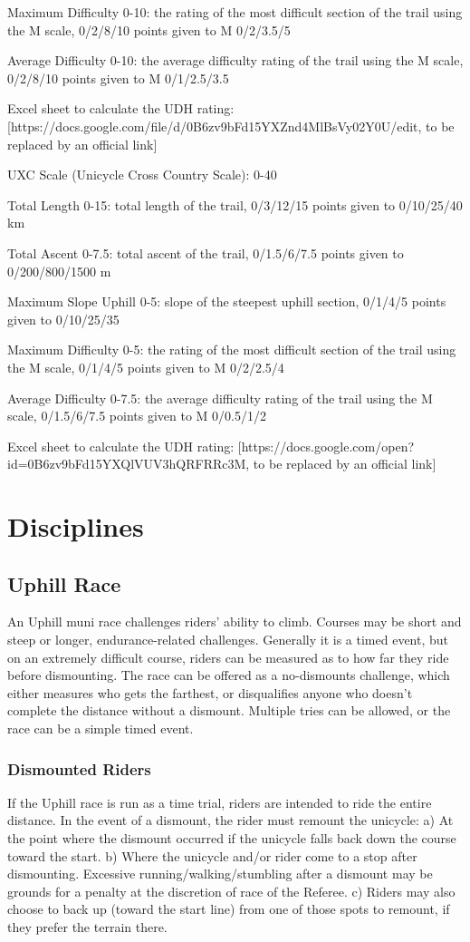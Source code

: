 Maximum Difficulty 0-10: the rating of the most difficult section of the trail using the M scale, 0/2/8/10 points given to M 0/2/3.5/5

Average Difficulty 0-10: the average difficulty rating of the trail using the M scale, 0/2/8/10 points given to M 0/1/2.5/3.5

Excel sheet to calculate the UDH rating: [https://docs.google.com/file/d/0B6zv9bFd15YXZnd4MlBsVy02Y0U/edit, to be replaced by an official link]

UXC Scale (Unicycle Cross Country Scale): 0-40

Total Length 0-15: total length of the trail, 0/3/12/15 points given to 0/10/25/40 km

Total Ascent 0-7.5: total ascent of the trail, 0/1.5/6/7.5 points given to 0/200/800/1500 m

Maximum Slope Uphill 0-5: slope of the steepest uphill section, 0/1/4/5 points given to 0/10/25/35%

Maximum Difficulty 0-5: the rating of the most difficult section of the trail using the M scale, 0/1/4/5 points given to M 0/2/2.5/4

Average Difficulty 0-7.5: the average difficulty rating of the trail using the M scale, 0/1.5/6/7.5 points given to M 0/0.5/1/2

Excel sheet to calculate the UDH rating: [https://docs.google.com/open?id=0B6zv9bFd15YXQlVUV3hQRFRRc3M, to be replaced by an official link]


\section{Disciplines}

\subsection{Uphill Race}
An Uphill muni race challenges riders' ability to climb. Courses may be short
and steep or longer, endurance-related challenges. Generally it is a timed
event, but on an extremely difficult course, riders can be measured as to how
far they ride before dismounting. The race can be offered as a no-dismounts
challenge, which either measures who gets the farthest, or disqualifies anyone
who doesn't complete the distance without a dismount. Multiple tries can be
allowed, or the race can be a simple timed event.

\subsubsection{Dismounted Riders}
If the Uphill race is run as a time trial, riders are intended to ride the
entire distance. In the event of a dismount, the rider must remount the
unicycle: 
a) At the point where the dismount occurred if the unicycle falls back
down the course toward the start. 
b) Where the unicycle and/or rider come to a
stop after dismounting. Excessive running/walking/stumbling after a dismount may
be grounds for a penalty at the discretion of race of the Referee. 
c) Riders may
also choose to back up (toward the start line) from one of those spots to
remount, if they prefer the terrain there.
 

